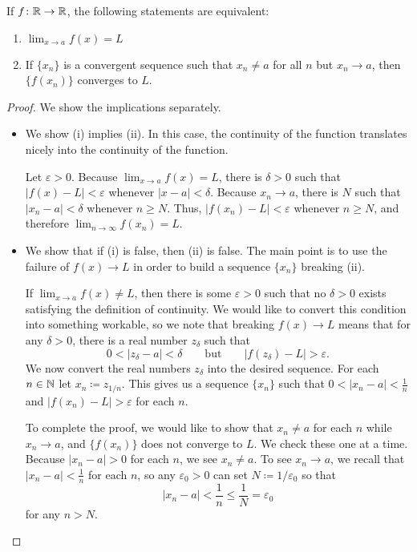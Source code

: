\documentclass[../notes.tex]{subfiles}
\begin{document}
\begin{prop}
\label{prop:seqs-and-limits}
    If $f\colon\mathbb R\to \mathbb R$, the following statements are equivalent:
    \begin{enumerate}[label=(\roman*)]
        \item $\lim_{x\to a}f(x) = L$
        \item If $\{x_n\}$ is a convergent sequence such that $x_n\neq a$ for all $n$ but $x_n\to a$, then $\{f(x_n)\}$ converges to $L$. 
    \end{enumerate}
\end{prop}
\begin{proof}
    We show the implications separately.
    \begin{itemize}
        \item We show (i) implies (ii). In this case, the continuity of the function translates nicely into the continuity of the function.
        
        Let $\varepsilon>0$. Because $\lim_{x\to a}f(x)=L$, there is $\delta>0$ such that $|f(x)-L| < \varepsilon$ whenever $|x-a|<\delta$. Because $x_n \to a$, there is $N$ such that $|x_n-a| < \delta$ whenever $n\geq N$. Thus, $|f(x_n)-L| < \varepsilon$ whenever $n\geq N$, and therefore $\lim_{n\to \infty} f(x_n) = L$.
        \item We show that if (i) is false, then (ii) is false. The main point is to use the failure of $f(x)\to L$ in order to build a sequence $\{x_n\}$ breaking (ii).
        
        If $\lim_{x\to a}f(x) \neq L$, then there is some $\varepsilon>0$ such that no $\delta > 0$ exists satisfying the definition of continuity. We would like to convert this condition into something workable, so we note that breaking $f(x)\to L$ means that for any $\delta > 0$, there is a real number $z_\delta$ such that
        \[0 < |z_\delta - a | < \delta\qquad\text{but}\qquad |f(z_\delta) - L| > \varepsilon.\]
        We now convert the real numbers $z_\delta$ into the desired sequence. For each $n\in \mathbb N$ let $x_n \coloneqq z_{1/n}$. This gives us a sequence $\{x_n\}$ such that $0 < |x_n- a| < \frac{1}{n}$ and $|f(x_n) - L|  >\varepsilon$ for each $n$.
        
        To complete the proof, we would like to show that $x_n\ne a$ for each $n$ while $x_n\to a$, and $\{f(x_n)\}$ does not converge to $L$. We check these one at a time. Because $|x_n-a|>0$ for each $n$, we see $x_n\ne a$. To see $x_n\to a$, we recall that $|x_n-a|<\frac1n$ for each $n$, so any $\varepsilon_0>0$ can set $N\coloneqq1/\varepsilon_0$ so that
        \[|x_n-a|<\frac1n\le\frac1N=\varepsilon_0\]
        for any $n>N$.


\end{itemize}
\end{proof}
\end{document}
